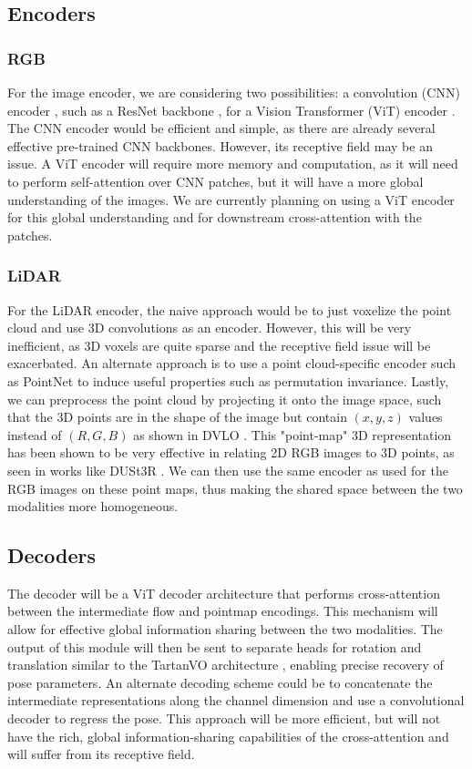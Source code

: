 \documentclass[11pt,a4paper]{article}
\begin{document}
\subsection{Encoders}
\subsubsection{RGB}
For the image encoder, we are considering two possibilities: a convolution (CNN) encoder \cite{cnn}, such as a ResNet backbone \cite{resnet}, for a Vision Transformer (ViT) encoder \cite{vit}. The CNN encoder would be efficient and simple, as there are already several effective pre-trained CNN backbones. However, its receptive field may be an issue. A ViT encoder will require more memory and computation, as it will need to perform self-attention over CNN patches, but it will have a more global understanding of the images. We are currently planning on using a ViT encoder for this global understanding and for downstream cross-attention with the patches.

\subsubsection{LiDAR}
For the LiDAR encoder, the naive approach would be to just voxelize the point cloud and use 3D convolutions as an encoder. However, this will be very inefficient, as 3D voxels are quite sparse and the receptive field issue will be exacerbated. An alternate approach is to use a point cloud-specific encoder such as PointNet \cite{pointnet} to induce useful properties such as permutation invariance. Lastly, we can preprocess the point cloud by projecting it onto the image space, such that the 3D points are in the shape of the image but contain $(x,y,z)$ values instead of $(R, G, B)$ as shown in DVLO \cite{dvlo}. This "point-map" 3D representation has been shown to be very effective in relating 2D RGB images to 3D points, as seen in works like DUSt3R \cite{dust3r}. We can then use the same encoder as used for the RGB images on these point maps, thus making the shared space between the two modalities more homogeneous.

\subsection{Decoders}
The decoder will be a ViT decoder architecture that performs cross-attention between the intermediate flow and pointmap encodings. This mechanism will allow for effective global information sharing between the two modalities. The output of this module will then be sent to separate heads for rotation and translation similar to the TartanVO architecture \cite{tartanvo}, enabling precise recovery of pose parameters. An alternate decoding scheme could be to concatenate the intermediate representations along the channel dimension and use a convolutional decoder to regress the pose. This approach will be more efficient, but will not have the rich, global information-sharing capabilities of the cross-attention and will suffer from its receptive field.
\end{document}
